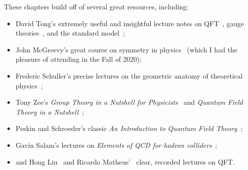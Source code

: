 These chapters build off of several great resources, including:
\begin{itemize}
	\item David Tong's extremely useful and insightful lecture notes on QFT~\cite{TongQFT}, gauge theories~\cite{TongGT}, and the standard model~\cite{TongSM};
	\item John McGreevy's great course on symmetry in physics~\cite{McGreevyGT} (which I had the pleasure of attending in the Fall of 2020);
	\item Frederic Schuller's precise lectures on the geometric anatomy of theoretical physics~\cite{SchullerGATP};
	\item Tony Zee's \textit{Group Theory in a Nutshell for Physicists}~\cite{Zee:2016fuk} and \textit{Quantum Field Theory in a Nutshell}~\cite{Zee:2003mt};
	\item Peskin and Schroeder's classic \textit{An Introduction to Quantum Field Theory}~\cite{Peskin:1995ev};
	\item Gavin Salam's lectures on \textit{Elements of QCD for hadron colliders}~\cite{Salam:2010zt};
	\item and Hong Liu~\cite{LiuRQFT} and Ricardo Matheus'~\cite{MatheusQFT} clear, recorded lectures on QFT.
\end{itemize}